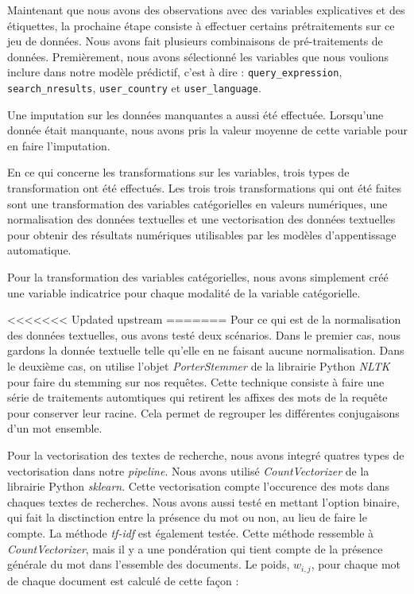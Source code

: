 Maintenant que nous avons des observations avec des variables explicatives et des étiquettes, la prochaine étape consiste à effectuer certains prétraitements sur ce jeu de données. Nous avons fait plusieurs combinaisons de pré-traitements de données. Premièrement, nous avons sélectionné les variables que nous voulions inclure dans notre modèle prédictif, c'est à dire : \texttt{query\_expression}, \texttt{search\_nresults}, \texttt{user\_country} et \texttt{user\_language}.

Une imputation sur les données manquantes a aussi été effectuée. Lorsqu'une donnée était manquante, nous avons pris la valeur moyenne de cette variable pour en faire l'imputation.

En ce qui concerne les transformations sur les variables, trois types de transformation ont été effectués.
Les trois trois transformations qui ont été faites sont une transformation des variables catégorielles en valeurs numériques, une normalisation des données textuelles et une vectorisation des données textuelles pour obtenir des résultats numériques utilisables par les modèles d'appentissage automatique.

Pour la transformation des variables catégorielles, nous avons simplement créé une variable indicatrice pour chaque modalité de la variable catégorielle.

<<<<<<< Updated upstream
=======
Pour ce qui est de la normalisation des données textuelles, ous avons testé deux scénarios.
Dans le premier cas, nous gardons la donnée textuelle telle qu'elle en ne faisant aucune normalisation.
Dans le deuxième cas, on utilise l'objet \emph{PorterStemmer} de la librairie Python \emph{NLTK} pour faire du stemming sur nos requêtes.
Cette technique consiste à faire une série de traitements automtiques qui retirent les affixes des mots de la requête pour conserver leur racine. 
Cela permet de regrouper les différentes conjugaisons d'un mot ensemble.

Pour la vectorisation des textes de recherche, nous avons integré quatres types de vectorisation dans notre \textit{pipeline}. 
Nous avons utilisé \textit{CountVectorizer} de la librairie Python \textit{sklearn}. Cette vectorisation compte l'occurence des mots dans chaques textes de recherches. Nous avons aussi testé en mettant l'option binaire, qui fait la disctinction entre la présence du mot ou non, au lieu de faire le compte. La méthode \textit{tf-idf} est également testée. Cette méthode ressemble à \textit{CountVectorizer}, mais il y a une pondération qui tient compte de la présence générale du mot dans l'essemble des documents. Le poids, $w_{i,j}$, pour chaque mot  de chaque document est calculé de cette façon :

